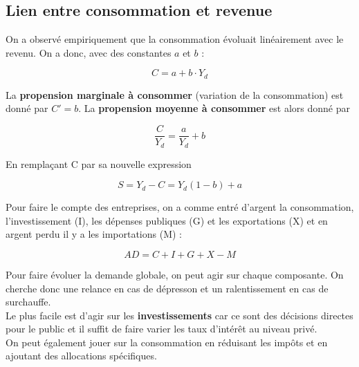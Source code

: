 \subsection{Lien entre consommation et revenue}
On a observé empiriquement que la consommation évoluait linéairement avec le revenu. On a donc, avec des constantes $a$ et $b$ :

\begin{equation}
	C = a + b \cdot Y_d 
\end{equation}

La \textbf{propension marginale à consommer} (variation de la consommation) est donné par $C' = b$. La \textbf{propension moyenne à consommer} est alors donné par 

\begin{equation}
	\frac{C}{Y_d} = \frac{a}{Y_d} + b
\end{equation}

En remplaçant C par sa nouvelle expression

\begin{equation}
	S = Y_d - C = Y_d(1-b) + a
\end{equation}

Pour faire le compte des entreprises, on a comme entré d'argent la consommation, l'investissement (I), les dépenses publiques (G) et les exportations (X) et en argent perdu il y a les importations (M) : 

\begin{equation}
	AD = C + I + G + X - M
\end{equation}

Pour faire évoluer la demande globale, on peut agir sur chaque composante. On cherche donc une relance en cas de dépresson et un ralentissement en cas de surchauffe. \\
Le plus facile est d'agir sur les \textbf{investissements} car ce sont des décisions directes pour le public et il suffit de faire varier les taux d'intérêt au niveau privé. \\
On peut également jouer sur la consommation en réduisant les impôts et en ajoutant des allocations spécifiques. 

